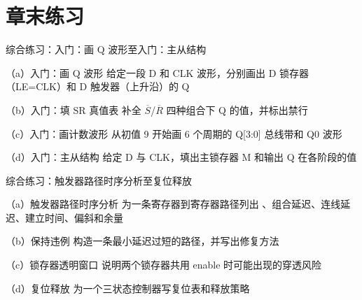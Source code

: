 \section*{章末练习}

\begin{chapterexercise}{综合练习：入门：画 Q 波形至入门：主从结构}
\begin{exercisesubproblem}{（a）入门：画 Q 波形}
给定一段 D 和 CLK 波形，分别画出 D 锁存器（LE=CLK）和 D 触发器（上升沿）的 Q
\end{exercisesubproblem}
\begin{exercisesubproblem}{（b）入门：填 SR 真值表}
补全 $\overline{S}$/$\overline{R}$ 四种组合下 Q 的值，并标出禁行
\end{exercisesubproblem}
\begin{exercisesubproblem}{（c）入门：画计数波形}
从初值 9 开始画 6 个周期的 Q[3:0] 总线带和 Q0 波形
\end{exercisesubproblem}
\begin{exercisesubproblem}{（d）入门：主从结构}
给定 D 与 CLK，填出主锁存器 M 和输出 Q 在各阶段的值
\end{exercisesubproblem}
\end{chapterexercise}

\begin{chapterexercise}{综合练习：触发器路径时序分析至复位释放}
\begin{exercisesubproblem}{（a）触发器路径时序分析}
为一条寄存器到寄存器路径列出 、组合延迟、连线延迟、建立时间、偏斜和余量
\end{exercisesubproblem}
\begin{exercisesubproblem}{（b）保持违例}
构造一条最小延迟过短的路径，并写出修复方法
\end{exercisesubproblem}
\begin{exercisesubproblem}{（c）锁存器透明窗口}
说明两个锁存器共用 enable 时可能出现的穿透风险
\end{exercisesubproblem}
\begin{exercisesubproblem}{（d）复位释放}
为一个三状态控制器写复位表和释放策略
\end{exercisesubproblem}
\end{chapterexercise}

